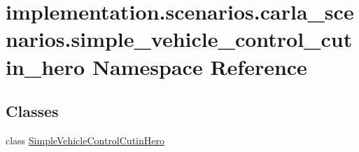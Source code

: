 \hypertarget{namespaceimplementation_1_1scenarios_1_1carla__scenarios_1_1simple__vehicle__control__cutin__hero}{}\section{implementation.\+scenarios.\+carla\+\_\+scenarios.\+simple\+\_\+vehicle\+\_\+control\+\_\+cutin\+\_\+hero Namespace Reference}
\label{namespaceimplementation_1_1scenarios_1_1carla__scenarios_1_1simple__vehicle__control__cutin__hero}
\subsection*{Classes}
\begin{DoxyCompactItemize}
\item 
class \hyperlink{classimplementation_1_1scenarios_1_1carla__scenarios_1_1simple__vehicle__control__cutin__hero_1_11e90bc75d1539d6c07dc5179559d6d0}{Simple\+Vehicle\+Control\+Cutin\+Hero}
\end{DoxyCompactItemize}

